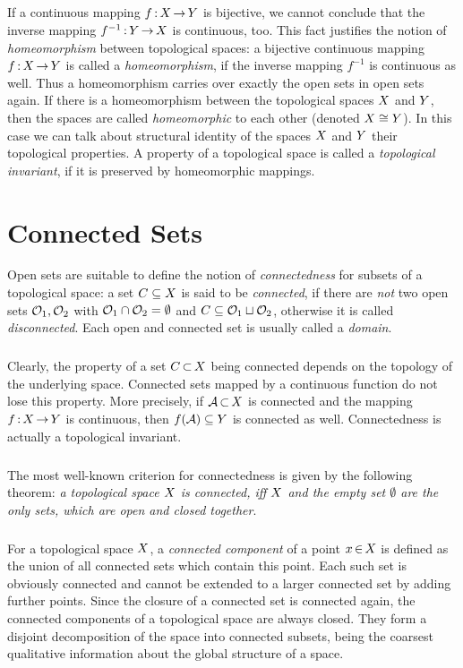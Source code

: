\documentclass[11pt,twoside]{article}
\begin{document}
\subparagraph{} %
If a continuous mapping $f {\,:\,} X {\,\to\,} Y$ is bijective,
we cannot conclude
that the inverse mapping $f^{-1} {\,:\,} Y {\,\to\,} X$ is continuous, too.
This fact justifies the notion of \textit{homeomorphism}
between topological spaces:
a bijective continuous mapping $f {\,:\,} X {\,\to\,} Y$
is called a \textit{homeomorphism},
if the inverse mapping $f^{-1}$ is continuous as well.
Thus a homeomorphism carries over exactly the open sets in open sets again.
If there is a homeomorphism between the topological spaces
$X$ and $Y$,
then the spaces are called \textit{homeomorphic} to each other
(denoted $X \cong Y$).
In this case we can talk about structural identity of the spaces $X$
and $Y$ {\wrt} their topological properties.
A property of a topological space is called
a \textit{topological invariant},
if it is preserved by homeomorphic mappings.

\section{Connected Sets}                                                       %
Open sets are suitable to define the notion of \textit{connectedness}
for subsets of a topological space:
a set $C \subseteq X$ is said to be \textit{connected},
if there are \textit{not} two open sets $\mathcal{O}_1,\mathcal{O}_2$ with
$\mathcal{O}_1 \cap \mathcal{O}_2=\emptyset$ and $C \subseteq \mathcal{O}_1 \sqcup \mathcal{O}_2$,
otherwise it is called \textit{disconnected}.
Each open and connected set is usually called a \textit{domain}.

\subparagraph{}
Clearly,
the property of a set $C {\,\subset\,} X$ being connected
depends on the topology of the underlying space.
Connected sets mapped by a continuous function do not lose this property.
More precisely,
if $\mathcal{A} {\,\subset\,} X$ is connected and the mapping $f {\,:\,} X {\,\to\,} Y$
is continuous,
then $f(\mathcal{A}) \subseteq Y$ is connected as well.
Connectedness is actually a topological invariant.

\subparagraph{}
The most well-known criterion for connectedness is given
by the following theorem:
\textit{a topological space $X$ is connected,
iff $X$ and the empty set $\emptyset$ are the only sets,
which are open and closed together}.

\subparagraph{} %
For a topological space $X$,
a \textit{connected component} of a point $x {\,\in\,} X$ is defined as
the union of all connected sets which contain this point.
Each such set is obviously connected
and cannot be extended to a larger connected set by adding further points.
Since the closure of a connected set is connected again,
the connected components of a topological space are always closed.
They form a disjoint decomposition of the space into connected subsets,
being the coarsest qualitative information about the global structure
of a space.
\end{document}
